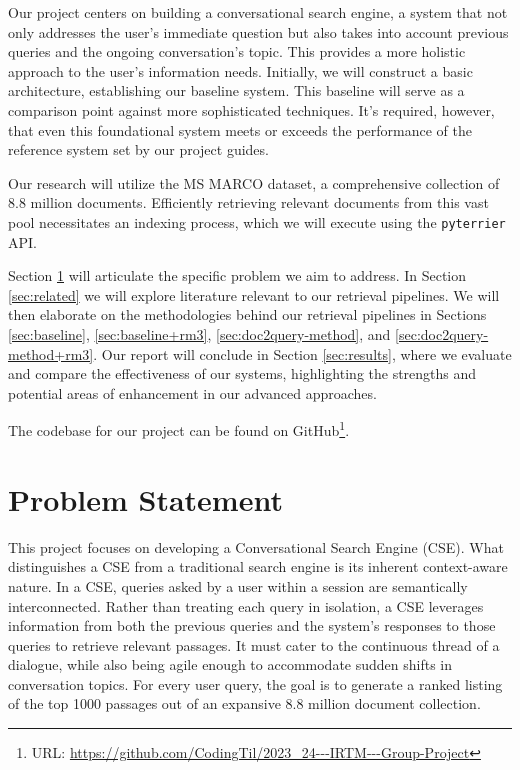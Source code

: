 \documentclass[sigconf]{acmart}
\begin{document}
Our project centers on building a conversational search engine, a system that not only addresses the user's immediate question but also takes into account previous queries and the ongoing conversation's topic. This provides a more holistic approach to the user's information needs. Initially, we will construct a basic architecture, establishing our baseline system. This baseline will serve as a comparison point against more sophisticated techniques. It's required, however, that even this foundational system meets or exceeds the performance of the reference system set by our project guides.

Our research will utilize the MS MARCO dataset, a comprehensive collection of 8.8 million documents. Efficiently retrieving relevant documents from this vast pool necessitates an indexing process, which we will execute using the \texttt{pyterrier} API.

Section \ref{sec:problem} will articulate the specific problem we aim to address. In Section \ref{sec:related} we will explore literature relevant to our retrieval pipelines. We will then elaborate on the methodologies behind our retrieval pipelines in Sections \ref{sec:baseline}, \ref{sec:baseline+rm3}, \ref{sec:doc2query-method}, and \ref{sec:doc2query-method+rm3}. Our report will conclude in Section \ref{sec:results}, where we evaluate and compare the effectiveness of our systems, highlighting the strengths and potential areas of enhancement in our advanced approaches.

The codebase for our project can be found on GitHub\footnote{URL: \url{https://github.com/CodingTil/2023_24---IRTM---Group-Project}}.

\section{Problem Statement}\label{sec:problem}
This project focuses on developing a Conversational Search Engine (CSE). What distinguishes a CSE from a traditional search engine is its inherent context-aware nature. In a CSE, queries asked by a user within a session are semantically interconnected. Rather than treating each query in isolation, a CSE leverages information from both the previous queries and the system's responses to those queries to retrieve relevant passages. It must cater to the continuous thread of a dialogue, while also being agile enough to accommodate sudden shifts in conversation topics. For every user query, the goal is to generate a ranked listing of the top 1000 passages out of an expansive 8.8 million document collection.
\end{document}
